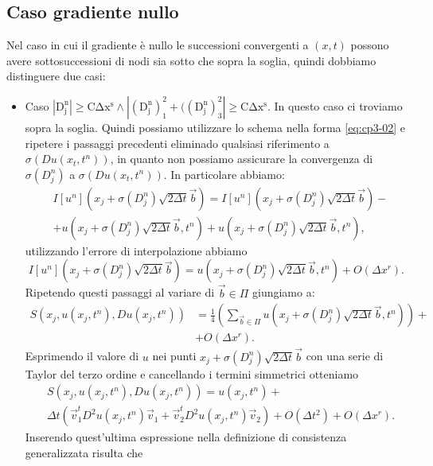 \subsection{Caso gradiente nullo}

Nel caso in cui il gradiente è nullo le successioni convergenti a $(x,t)$ possono avere sottosuccessioni di nodi sia sotto che sopra la soglia, quindi dobbiamo distinguere due casi:
\begin{itemize}
  \item \textsf{Caso} $\mathrm{|D_j^n|\ge C\Delta x^s\land|(D_j^n)_1^2+((D_j^n)_3^2|\ge C\Delta x^s}$. In questo caso ci troviamo sopra la soglia. Quindi possiamo utilizzare lo schema nella forma \eqref{eq:cp3-02} e ripetere i passaggi precedenti eliminado qualsiasi riferimento a $\sigma(Du(x_t,t^n))$, in quanto non possiamo assicurare la convergenza di $\sigma(D_j^n)$ a $\sigma(Du(x_t,t^n))$. In particolare abbiamo:
\[
  \begin{split}
    & I[u^n](x_j+\sigma(D_j^n)\sqrt{2\Delta t}\vec{b}) = I[u^n](x_j+\sigma(D_j^n)\sqrt{2\Delta t}\vec{b}) - \\
    & +u(x_j+\sigma(D_j^n)\sqrt{2\Delta t}\vec{b},t^n) + u(x_j+\sigma(D_j^n)\sqrt{2\Delta t}\vec{b},t^n),
  \end{split}
\]
utilizzando l'errore di interpolazione abbiamo
\[
I[u^n](x_j+\sigma(D_j^n)\sqrt{2\Delta t}\vec{b})=u(x_j+\sigma(D_j^n)\sqrt{2\Delta t}\vec{b},t^n) + O(\Delta x^r).
\]
Ripetendo questi passaggi al variare di $\vec{b}\in\Pi$ giungiamo a:
\[
 \begin{split}
 S(x_j,u(x_j,t^n),Du(x_j,t^n))&=\frac{1}{4}\left(\sum_{\vec{b}\in\Pi}u(x_j+\sigma(D_j^n)\sqrt{2\Delta t}\vec{b},t^n)\right)+\\
  &+ O(\Delta x^r).
 \end{split}
\]
Esprimendo il valore di $u$ nei punti $x_j+\sigma(D_j^n)\sqrt{2\Delta t}\vec{b}$ con una serie di Taylor del terzo ordine e cancellando i termini simmetrici otteniamo
\begin{equation}
  \label{eq:cp3-11}
  \begin{split}
    &S(x_j,u(x_j,t^n),Du(x_j,t^n)) = u(x_j,t^n) + \\
    &\Delta t\left(\vec{v}_1^tD^2u(x_j,t^n)\vec{v}_1 + \vec{v}_2^tD^2u(x_j,t^n)\vec{v}_2\right) + O(\Delta t^2) + O(\Delta x^r).
   \end{split}
\end{equation}
Inserendo quest'ultima espressione nella definizione di consistenza generalizzata risulta che
\[
\begin{split}

\end{split}\]
\end{itemize}
